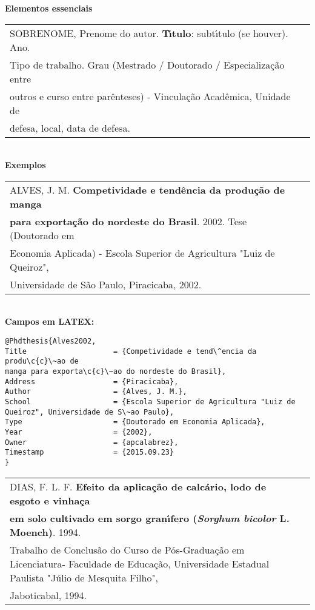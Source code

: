 \textbf{Elementos essenciais}\\

\begin{tabular}{|l|c|} \hline
	SOBRENOME, Prenome do autor. \textbf{T\'{\i}tulo}: subt\'{\i}tulo (se houver). Ano. \\ Tipo de trabalho. Grau (Mestrado / Doutorado / Especializa\c{c}\~ao entre \\ outros e curso entre par\^enteses) - Vincula\c{c}\~ao Acad\^emica, Unidade de \\ defesa, local, data de defesa.\\\hline
\end{tabular}\\

\textbf{Exemplos}\\

\begin{tabular}{|l|c|} \hline
	ALVES, J. M. \textbf{Competividade e tend\^encia da produ\c{c}\~ao de manga} \\ \textbf{para exporta\c{c}\~ao do nordeste do Brasil}. 2002. Tese (Doutorado em \\ Economia Aplicada) - Escola Superior de Agricultura "Luiz de Queiroz", \\ Universidade de S\~ao Paulo, Piracicaba, 2002.    \\\hline
\end{tabular} \\

\textbf{Campos em LATEX:}

\begin{verbatim}
@Phdthesis{Alves2002,
Title                    = {Competividade e tend\^encia da produ\c{c}\~ao de 
manga para exporta\c{c}\~ao do nordeste do Brasil},
Address                  = {Piracicaba},
Author                   = {Alves, J. M.},
School                   = {Escola Superior de Agricultura "Luiz de 
Queiroz", Universidade de S\~ao Paulo},
Type                     = {Doutorado em Economia Aplicada},
Year                     = {2002},
Owner                    = {apcalabrez},
Timestamp                = {2015.09.23}
}
\end{verbatim} 

\begin{tabular}{|l|c|} \hline
	DIAS, F. L. F. \textbf{Efeito da aplica\c{c}\~ao de calc\'ario, lodo de esgoto e vinha\c{c}a} \\ \textbf{em solo cultivado em sorgo gran\'{\i}fero (\textit{Sorghum bicolor} L. Moench)}. 1994. \\ Trabalho de Conclus\~ao do Curso de P\'os-Gradua\c{c}\~ao em Licenciatura- Faculdade de Educa\c{c}\~ao, Universidade Estadual Paulista "J\'ulio de Mesquita Filho", \\ Jaboticabal, 1994.     \\\hline
\end{tabular} \\

